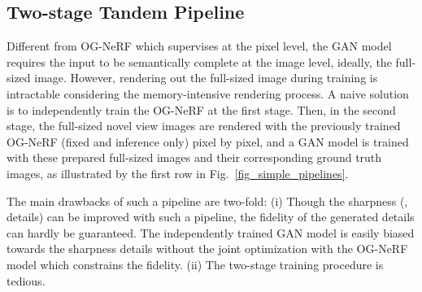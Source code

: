 \subsection{\textbf{Two-stage Tandem Pipeline}}
\label{sec:ttp}
Different from OG-NeRF which supervises at the pixel level, the GAN model requires the input to be semantically complete at the image level, ideally, the full-sized image. However, rendering out the full-sized image during training is intractable considering the memory-intensive rendering process. A naive solution is to independently train the OG-NeRF at the first stage. Then, in the second stage, the full-sized novel view images are rendered with the previously trained OG-NeRF (fixed and inference only) pixel by pixel, and a GAN model is trained with these prepared full-sized images and their corresponding ground truth images, as illustrated by the first row in Fig.~\ref{fig_simple_pipelines}. 

The main drawbacks of such a pipeline are two-fold: (i) Though the sharpness (\ie, details) can be improved with such a pipeline, the fidelity of the generated details can hardly be guaranteed. The independently trained GAN model is easily biased towards the sharpness details without the joint optimization with the OG-NeRF model which constrains the fidelity. (ii) The two-stage training procedure is tedious. 

\vspace{-2mm}
